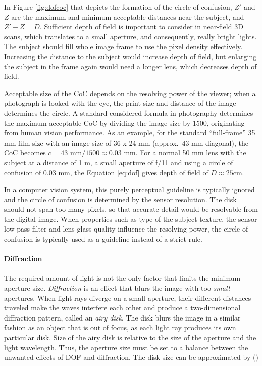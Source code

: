 In Figure \ref{fig:dofcoc} that depicts the formation of the circle of confusion, $Z'$ and $Z$ are the maximum and minimum acceptable distances near the subject, and $Z' - Z = D$.
Sufficient depth of field is important to consider in near-field 3D scans, which translates to a small aperture, and consequently, really bright lights.
The subject should fill whole image frame to use the pixel density effectively.
Increasing the distance to the subject would increase depth of field, but enlarging the subject in the frame again would need a longer lens, which decreases depth of field.

Acceptable size of the CoC depends on the resolving power of the viewer; when a photograph is looked with the eye, the print size and distance of the image determines the circle. \cite{greenleaf1950photographic}
A standard-considered formula in photography determines the maximum acceptable CoC by dividing the image size by 1500, originating from human vision performance.
\cite[p. 88, 92]{kingslake1992optics}
As an example, for the standard ``full-frame'' 35 mm film size with an image size of 36 x 24 mm (approx.\ 43 mm diagonal), the CoC becomes $c = 43 \text{ mm} / 1500 \approx 0.03 \text{ mm}$.
For a normal 50 mm lens with the subject at a distance of 1 m, a small aperture of f/11 and using a circle of confusion of 0.03 mm, the Equation \ref{eq:dof} gives depth of field of $D \approx 25 \text{cm}$. 

In a computer vision system, this purely perceptual guideline is typically ignored and the circle of confusion is determined by the sensor resolution.
The disk should not span too many pixels, so that accurate detail would be resolvable from the digital image.
When properties such as type of the subject texture, the sensor low-pass filter and lens glass quality influence the resolving power, the circle of confusion is typically used as a guideline instead of a strict rule.


\paragraph{Diffraction}
The required amount of light is not the only factor that limits the minimum aperture size.
\emph{Diffraction} is an effect that blurs the image with too \emph{small} apertures.
When light rays diverge on a small aperture, their different distances traveled make the waves interfere each other and produce a two-dimensional diffraction pattern, called an \emph{airy disk}.
\cite{greenleaf1950photographic}
The disk blurs the image in a similar fashion as an object that is out of focus, as each light ray produces its own particular disk.
Size of the airy disk is relative to the size of the aperture and the light wavelength.
Thus, the aperture size must be set to a balance between the unwanted effects of DOF and diffraction.
The disk size can be approximated by (\cite{greenleaf1950photographic})

